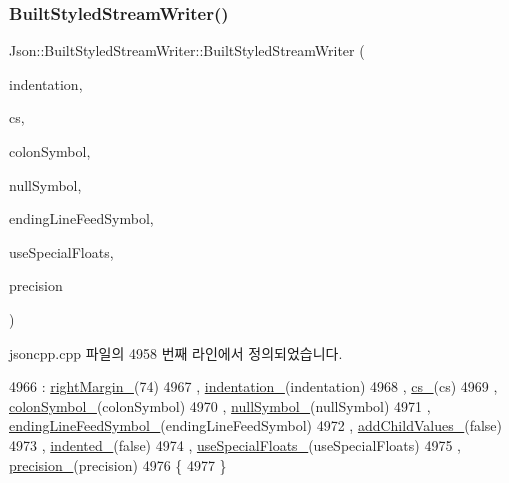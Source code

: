 \subsubsection{\texorpdfstring{Built\+Styled\+Stream\+Writer()}{BuiltStyledStreamWriter()}}
{\footnotesize\ttfamily Json\+::\+Built\+Styled\+Stream\+Writer\+::\+Built\+Styled\+Stream\+Writer (\begin{DoxyParamCaption}\item[{\hyperlink{json_8h_a1e723f95759de062585bc4a8fd3fa4be}{J\+S\+O\+N\+C\+P\+P\+\_\+\+S\+T\+R\+I\+NG} const \&}]{indentation,  }\item[{\hyperlink{struct_json_1_1_comment_style_a51fc08f3518fd81eba12f340d19a3d0c}{Comment\+Style\+::\+Enum}}]{cs,  }\item[{\hyperlink{json_8h_a1e723f95759de062585bc4a8fd3fa4be}{J\+S\+O\+N\+C\+P\+P\+\_\+\+S\+T\+R\+I\+NG} const \&}]{colon\+Symbol,  }\item[{\hyperlink{json_8h_a1e723f95759de062585bc4a8fd3fa4be}{J\+S\+O\+N\+C\+P\+P\+\_\+\+S\+T\+R\+I\+NG} const \&}]{null\+Symbol,  }\item[{\hyperlink{json_8h_a1e723f95759de062585bc4a8fd3fa4be}{J\+S\+O\+N\+C\+P\+P\+\_\+\+S\+T\+R\+I\+NG} const \&}]{ending\+Line\+Feed\+Symbol,  }\item[{bool}]{use\+Special\+Floats,  }\item[{unsigned int}]{precision }\end{DoxyParamCaption})}



jsoncpp.\+cpp 파일의 4958 번째 라인에서 정의되었습니다.


\begin{DoxyCode}
4966   : \hyperlink{struct_json_1_1_built_styled_stream_writer_a06a51521ccae20397f52fe3036edc602}{rightMargin\_}(74)
4967   , \hyperlink{struct_json_1_1_built_styled_stream_writer_aaa4cbad91428ceca37cbabfc2a17a92d}{indentation\_}(indentation)
4968   , \hyperlink{struct_json_1_1_built_styled_stream_writer_a89a9c76c7531143b52785861ba21c1d4}{cs\_}(cs)
4969   , \hyperlink{struct_json_1_1_built_styled_stream_writer_a9f10991ddef9b77d0b580e24e71483c6}{colonSymbol\_}(colonSymbol)
4970   , \hyperlink{struct_json_1_1_built_styled_stream_writer_a6ccceadf4b1286a519a175cb59cb61d5}{nullSymbol\_}(nullSymbol)
4971   , \hyperlink{struct_json_1_1_built_styled_stream_writer_a5e61a9a4b2af52b98900286c843b86f7}{endingLineFeedSymbol\_}(endingLineFeedSymbol)
4972   , \hyperlink{struct_json_1_1_built_styled_stream_writer_abed9cc31da503b48798e7cea68c42e16}{addChildValues\_}(\textcolor{keyword}{false})
4973   , \hyperlink{struct_json_1_1_built_styled_stream_writer_a6aa0ad023e623f600103631a6bca6d10}{indented\_}(\textcolor{keyword}{false})
4974   , \hyperlink{struct_json_1_1_built_styled_stream_writer_a6f1b8694b4eb17ab8c34f6d6dd8c8a4a}{useSpecialFloats\_}(useSpecialFloats)
4975   , \hyperlink{struct_json_1_1_built_styled_stream_writer_a6373d8d0ae4741b64e3904e4db0eef46}{precision\_}(precision)
4976 \{
4977 \}
\end{DoxyCode}


